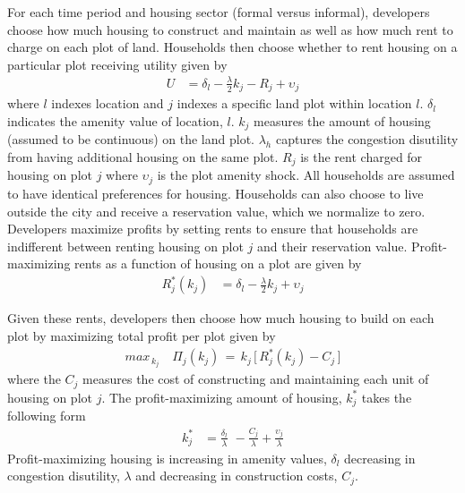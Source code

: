 \documentclass[12pt]{article}
\begin{document}
For each time period and housing sector (formal versus informal), developers choose how much housing to construct and maintain as well as how much rent to charge on each plot of land.  Households then choose whether to rent housing on a particular plot receiving utility given by
\begin{align*}
U &= \delta_{l} - \frac{\lambda}{2} k_{j} - R_{j}   + \upsilon_{j}  
\end{align*}
\noindent where $l$ indexes location and $j$ indexes a specific land plot within location $l$.  $\delta_{l}$ indicates the amenity value of location, $l$.  $k_{j}$ measures the amount of housing (assumed to be continuous) on the land plot.  $\lambda_{h}$ captures the congestion disutility from having additional housing on the same plot.   $R_{j}$ is the rent charged for housing on plot $j$ where $\upsilon_{j}$ is the plot amenity shock.  All households are assumed to have identical preferences for housing.   Households can also choose to live outside the city and receive a reservation value, which we normalize to zero.  Developers maximize profits by setting rents to ensure that households are indifferent between renting housing on plot $j$ and their reservation value. Profit-maximizing rents as a function of housing on a plot are given by
\begin{align*}
R_{j}^{*}(k_{j}) &= \delta_{l} - \frac{\lambda}{2} k_{j} + \upsilon_{j}
\end{align*}

Given these rents, developers then choose how much housing to build on each plot by maximizing total profit per plot given by
\begin{align*}
max_{\,k_{j}} \,\,\,\,\,\, \Pi_{j}(k_{j}) \,=\, k_{j} \, \Big[ \, R_{j}^{*}(k_{j}) - C_j \, \Big ]
\end{align*}
\noindent where the $C_j$ measures the cost of constructing and maintaining each unit of housing on plot $j$.  The profit-maximizing amount of housing, $k^{*}_{j}$ takes the following form
\begin{align}
\label{eq:kstar}
k_{j}^{*} &= \frac{\delta_{l}}{\lambda} \,\, - \frac{C_j}{\lambda} + \frac{\upsilon_{j}}{\lambda}
\end{align}
Profit-maximizing housing is increasing in amenity values, $\delta_{l}$ decreasing in congestion disutility, $\lambda$ and decreasing in construction costs, $C_j$.  
\end{document}
